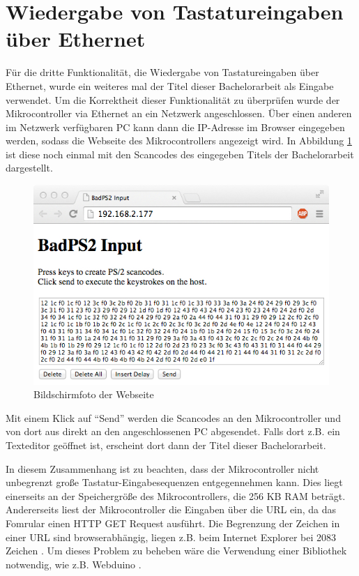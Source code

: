 \section{Wiedergabe von Tastatureingaben über Ethernet}
Für die dritte Funktionalität, die Wiedergabe von Tastatureingaben über Ethernet, wurde ein weiteres mal der Titel dieser Bachelorarbeit als Eingabe verwendet. Um die Korrektheit dieser Funktionalität zu überprüfen wurde der Mikrocontroller via Ethernet an ein Netzwerk angeschlossen. Über einen anderen im Netzwerk verfügbaren PC kann dann die IP-Adresse im Browser eingegeben werden, sodass die Webseite des Mikrocontrollers angezeigt wird. In Abbildung \ref{website2} ist diese noch einmal mit den Scancodes des eingegeben Titels der Bachelorarbeit dargestellt.
\begin{figure}
  \centering
  \includegraphics[width=1\textwidth]{images/website2.jpg}
  \caption{Bildschirmfoto der Webseite}
  \label{website2}
\end{figure}

Mit einem Klick auf ``Send'' werden die Scancodes an den Mikrocontroller und von dort aus direkt an den angeschlossenen PC abgesendet. Falls dort z.B. ein Texteditor geöffnet ist, erscheint dort dann der Titel dieser Bachelorarbeit.

\noindent In diesem Zusammenhang ist zu beachten, dass der Mikrocontroller nicht unbegrenzt große Tastatur-Eingabesequenzen entgegennehmen kann. Dies liegt einerseits an der Speichergröße des Mikrocontrollers, die 256 KB RAM beträgt. Andererseits liest der Mikrocontroller die Eingaben über die URL ein, da das Fomrular einen HTTP GET Request ausführt. Die Begrenzung der Zeichen in einer URL sind browserabhängig, liegen z.B. beim Internet Explorer bei 2083 Zeichen \cite{url_length}. Um dieses Problem zu beheben wäre die Verwendung einer Bibliothek notwendig, wie z.B. Webduino \cite{webduino}.